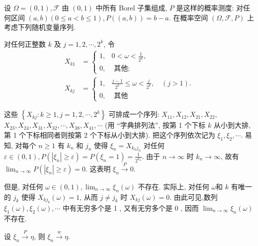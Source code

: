 \begin{example}
    设 $\Omega=(0,1), \mathscr{F}$ 由 $(0,1)$ 中所有 Borel 子集组成, $P$ 是这样的概率测度: 对任何区间 $(a, b)(0 \leqslant a<b \leqslant 1), P((a, b))=b-a$. 在概率空间 $(\Omega, \mathscr{F}, P)$ 上考虑下列随机变量序列.

    对任何正整数 $k$ 及 $j=1,2, \cdots, 2^k$, 令
$$
\begin{aligned}
X_{k 1} & = \begin{cases}1, & 0<\omega<\frac{1}{2^k}, \\
0, & \text { 其他; }\end{cases} \\
X_{k j} & = \begin{cases}1, & \frac{j-1}{2^k} \leqslant \omega<\frac{j}{2^k}, \quad(j>1) . \\
0, & \text { 其他 }\end{cases}
\end{aligned}
$$

这些 $\left\{X_{k j}: k \geqslant 1, j=1,2, \cdots, 2^k\right\}$ 可排成一个序列: $X_{11}, X_{12}, X_{21}, X_{22}$, $X_{23}, X_{24}, X_{31}, X_{32}, \cdots, X_{38}, X_{41}, \cdots$ (用 “字典排列法”, 按第 1 个下标 $k$ 从小到大排, 第 1 个下标相同者则按第 2 个下标从小到大排). 把这个序列依次记为 $\xi_1, \xi_2, \cdots$. 易知, 对每个 $n \geqslant 1$ 有 $k_n$ 和 $j_n$ 使得 $\xi_n=X_{k_n j_n}$ 对任何 $\varepsilon \in(0,1), P\left(\left|\xi_n\right| \geqslant \varepsilon\right)=P\left(\xi_n=1\right)=\frac{1}{2^{k_n}}$. 由于 $n \rightarrow \infty$ 时 $k_n \rightarrow \infty$, 故有 $\lim _{n \rightarrow \infty} P\left(\left|\xi_n\right| \geqslant \varepsilon\right)=0$. 这表明 $\xi_n \stackrel{P}{\longrightarrow} 0$.

但是, 对任何 $\omega \in(0,1), \lim _{n \rightarrow \infty} \xi_n(\omega)$ 不存在. 实际上, 对任何 $\omega$和 $k$ 有唯一的 $j_k$ 使得 $X_{k j_k}(\omega)=1$, 从而 $j \neq j_k$ 时 $X_{k j}(\omega)=0$. 由此可见,数列 $\xi_1(\omega), \xi_2(\omega), \cdots$ 中有无穷多个是 1 , 又有无穷多个是 0 , 因而 $\lim _{n \rightarrow \infty} \xi_n(\omega)$ 不存在.
\end{example}

\begin{theorem}
    设 $\xi_n \stackrel{P}{\longrightarrow} \eta$, 则 $\xi_n \stackrel{w}{\longrightarrow} \eta$.
\end{theorem}

